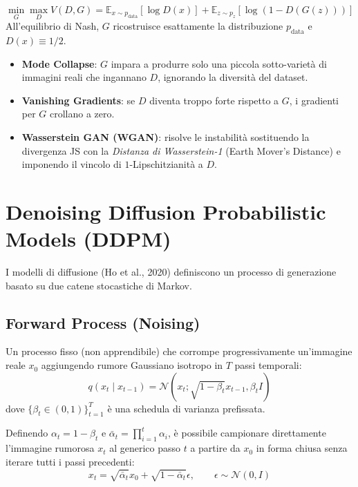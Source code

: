 \documentclass[12pt, a4paper]{report}
\begin{document}
\begin{defbox}
\[
  \min_G \max_D V(D, G) = \mathbb{E}_{x \sim p_{\text{data}}}[\log D(x)] + \mathbb{E}_{z \sim p_z}[\log(1 - D(G(z)))]
\]
All'equilibrio di Nash, $G$ ricostruisce esattamente la distribuzione $p_{\text{data}}$ e $D(x) \equiv 1/2$.
\end{defbox}

\begin{warnbox}
\begin{itemize}
  \item \textbf{Mode Collapse}: $G$ impara a produrre solo una piccola sotto-varietà
        di immagini reali che ingannano $D$, ignorando la diversità del dataset.
  \item \textbf{Vanishing Gradients}: se $D$ diventa troppo forte rispetto a $G$, i
        gradienti per $G$ crollano a zero.
  \item \textbf{Wasserstein GAN (WGAN)}: risolve le instabilità sostituendo la
        divergenza JS con la \emph{Distanza di Wasserstein-1} (Earth Mover's Distance) e
        imponendo il vincolo di $1$-Lipschitzianità a $D$.
\end{itemize}
\end{warnbox}

\section{Denoising Diffusion Probabilistic Models (DDPM)}

I modelli di diffusione (Ho et al., 2020) definiscono un processo di generazione basato
su due catene stocastiche di Markov.

\subsection{Forward Process (Noising)}

Un processo fisso (non apprendibile) che corrompe progressivamente un'immagine reale $x_0$
aggiungendo rumore Gaussiano isotropo in $T$ passi temporali:
\[
  q(x_t \mid x_{t-1}) = \mathcal{N}\left(x_t; \sqrt{1 - \beta_t} x_{t-1}, \beta_t I\right)
\]
dove $\{\beta_t \in (0, 1)\}_{t=1}^T$ è una schedula di varianza prefissata.

\begin{propbox}
Definendo $\alpha_t = 1 - \beta_t$ e $\bar{\alpha}_t = \prod_{i=1}^t \alpha_i$, è
possibile campionare direttamente l'immagine rumorosa $x_t$ al generico passo $t$ a partire
da $x_0$ in forma chiusa senza iterare tutti i passi precedenti:
\[
  x_t = \sqrt{\bar{\alpha}_t} x_0 + \sqrt{1 - \bar{\alpha}_t} \epsilon, \qquad \epsilon \sim \mathcal{N}(0, I)
\]
\end{propbox}
\end{document}
